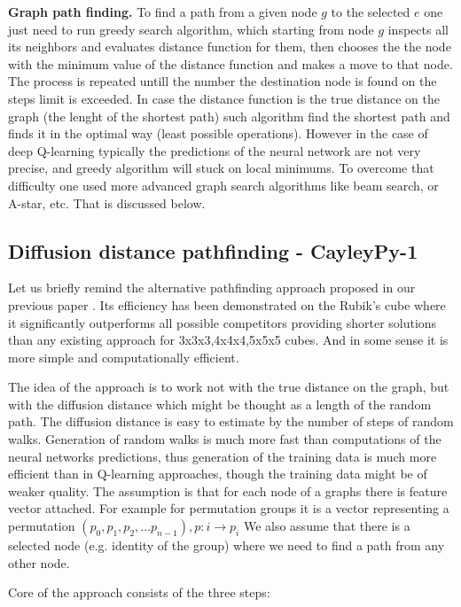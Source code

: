 \documentclass[atmp]{ipart_v1}
\numberwithin{equation}{section}
\theoremstyle{plain}%
\begin{document}
{\bf Graph path finding.}
To find a path from a given node $g$ to the selected  $e$ one just need to run greedy search algorithm, which starting from node $g$ inspects all its neighbors and evaluates distance function for them, then chooses the the node with the minimum value of the distance function and makes a move to that node. The process is repeated untill the number the destination node is found on the steps limit is exceeded. In case the distance function is the true distance on the graph (the lenght of the shortest path) such algorithm find the shortest path and finds it in the optimal way (least possible operations). However in the case of deep Q-learning typically the predictions of the neural network are not very precise, and greedy algorithm will stuck on local minimums. To overcome that difficulty one used more advanced graph search algorithms like beam search, or A-star, etc. That is discussed below.

\subsection{Diffusion distance pathfinding - CayleyPy-1}
Let us briefly remind the alternative pathfinding approach proposed in our previous paper \cite{chervov2025machinelearningapproachbeats}. Its efficiency has been demonstrated on the Rubik's cube where it significantly outperforms all possible competitors providing shorter solutions than any existing approach for 3x3x3,4x4x4,5x5x5 cubes. And in some sense it is more simple and computationally efficient. 

The idea of the approach is to work not with the true distance on the graph, but with the diffusion distance which might be thought as a length of the random path. The diffusion distance is easy to estimate by the number of steps of random walks. Generation of random walks is much more fast than computations of the neural networks predictions, thus generation of the training data is much more efficient than in Q-learning approaches, though the training data might be of weaker quality. 
The assumption is that for each node of a graphs there is feature vector attached. For example for permutation groups it is a vector representing a permutation $(p_0,p_1,p_2,...p_{n-1}), p:i \to p_i $
We also assume that there is a selected node (e.g. identity of the group) where we need to find a path from any other node. 

Core of the approach consists of the three steps:
\end{document}
